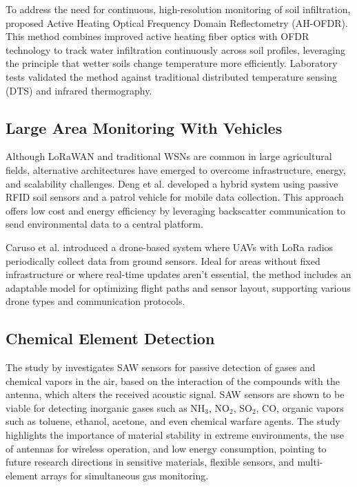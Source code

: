 \documentclass[conference]{IEEEtran}
\begin{document}
To address the need for continuous, high-resolution monitoring of soil infiltration, \cite{sun_2024_highresolution} proposed Active Heating Optical Frequency Domain Reflectometry (AH-OFDR). This method combines improved active heating fiber optics with OFDR technology to track water infiltration continuously across soil profiles, leveraging the principle that wetter soils change temperature more efficiently. Laboratory tests validated the method against traditional distributed temperature sensing (DTS) and infrared thermography.

\subsection{Large Area Monitoring With Vehicles}

Although LoRaWAN and traditional WSNs are common in large agricultural fields, alternative architectures have emerged to overcome infrastructure, energy, and scalability challenges. Deng et al. \cite{deng_2020_novel} developed a hybrid system using passive RFID soil sensors and a patrol vehicle for mobile data collection. This approach offers low cost and energy efficiency by leveraging backscatter communication to send environmental data to a central platform.

Caruso et al. \cite{caruso_2021_drone} introduced a drone-based system where UAVs with LoRa radios periodically collect data from ground sensors. Ideal for areas without fixed infrastructure or where real-time updates aren't essential, the method includes an adaptable model for optimizing flight paths and sensor layout, supporting various drone types and communication protocols.

\subsection{Chemical Element Detection}

The study by \cite{devkota_2017_saw} investigates SAW sensors for passive detection of gases and chemical vapors in the air, based on the interaction of the compounds with the antenna, which alters the received acoustic signal. SAW sensors are shown to be viable for detecting inorganic gases such as NH$_3$, NO$_2$, SO$_2$, CO, organic vapors such as toluene, ethanol, acetone, and even chemical warfare agents.
The study highlights the importance of material stability in extreme environments, the use of antennas for wireless operation, and low energy consumption, pointing to future research directions in sensitive materials, flexible sensors, and multi-element arrays for simultaneous gas monitoring.
\end{document}
